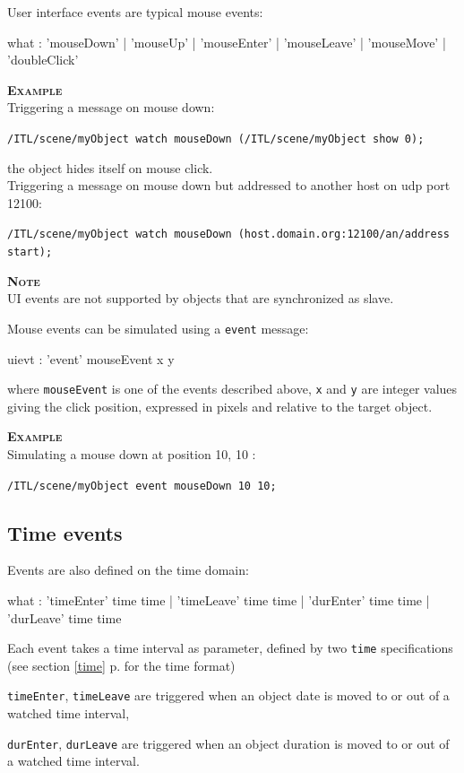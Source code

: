 \documentclass[a4paper,twoside]{report}
\newcommand{\subsublevel}[1]	{\subsection{#1}}
\newcommand{\fullref}[1]	{\ref{#1} p.\pageref{#1}}
\newcommand{\OSC}[1]		{\texttt{#1}}
\newcommand{\example}		{\textbf{\hspace{-1.5cm}\textbf{\textsc{Example }}}}
\newcommand{\note}	[1]		{\vspace{2mm}\textbf{\hspace{-1.03cm}\textbf{\textsc{Note #1}}}}
\let\olditemize\itemize
\let\oldenditemize\enditemize
\renewenvironment{itemize} 	{\olditemize \setlength{\itemsep}{1mm}}{\oldenditemize}
\newcommand{\sample}	[1]			{\vspace{-2mm}\begin{center}\colorbox{mygrey}{
								\begin{minipage}[t]{0.9\columnwidth} 
								{\small \texttt{#1}}
								\end{minipage}}\end{center}}
\newcommand{\sampleindent}	{ \hspace{0.5cm} }
\begin{document}
User interface events are typical mouse events:
\begin{rail}
what : 'mouseDown' | 'mouseUp' | 'mouseEnter' | 'mouseLeave' | 'mouseMove' | 'doubleClick' 
\end{rail}
	
\example \\
Triggering a message on mouse down:
\sample{/ITL/scene/myObject watch mouseDown (/ITL/scene/myObject show 0);}
\sampleindent the object hides itself on mouse click. \\
Triggering a message on mouse down but addressed to another host on udp port 12100:
\sample{/ITL/scene/myObject watch mouseDown (host.domain.org:12100/an/address start); }

\note{} \\
UI events are not supported by objects that are synchronized as slave.

Mouse events can be simulated using a \OSC{event} message:
\begin{rail}
uievt : 'event' mouseEvent x y
\end{rail}
where \OSC{mouseEvent} is one of the events described above, \OSC{x} and \OSC{y} are integer values giving the click position, expressed in pixels and relative to the target object.

\example \\
Simulating a mouse down at position 10, 10 :
\sample{/ITL/scene/myObject event mouseDown 10 10;}


\subsublevel{Time events}
\label{timeevents}

Events are also defined on the time domain:
\begin{rail}
what : 	'timeEnter' time time | 'timeLeave' time time 
		| 'durEnter' time time | 'durLeave' time time 
\end{rail}

Each event takes a time interval as parameter, defined by two \OSC{time} specifications (see section \fullref{time} for the time format)

\begin{itemize}
\item \OSC{timeEnter}, \OSC{timeLeave} are triggered when an object date is moved to or out of a watched time interval,
\item \OSC{durEnter}, \OSC{durLeave} are triggered when an object duration is moved to or out of a watched time interval.
\end{itemize}
\end{document}
